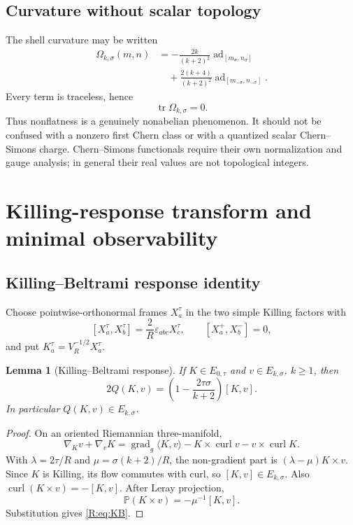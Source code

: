 \documentclass[
 aps,
 prd,
 reprint,
 amsmath,
 amssymb,
 nofootinbib,
 superscriptaddress
]{revtex4-2}
\newtheorem{lemma}[theorem]{Lemma}
\theoremstyle{definition}
\theoremstyle{remark}
\newcommand{\PP}{\mathbb P}
\newcommand{\curl}{\operatorname{curl}}
\newcommand{\gradg}{\operatorname{grad}_g}
\newcommand{\tr}{\operatorname{tr}}
\newcommand{\ad}{\operatorname{ad}}
\begin{document}
\subsection{Curvature without scalar topology}

The shell curvature may be written
\[
\begin{aligned}
 \Omega_{k,\sigma}(m,n)
 &=
 -\frac{2k}{(k+2)^2}
 \ad_{[m_\sigma,n_\sigma]}\\
 &\quad+
 \frac{2(k+4)}{(k+2)^2}
 \ad_{[m_{-\sigma},n_{-\sigma}]}.
\end{aligned}
\]
Every term is traceless, hence
\[
 \tr\Omega_{k,\sigma}=0.
\]
Thus nonflatness is a genuinely nonabelian phenomenon.  It should not be
confused with a nonzero first Chern class or with a quantized scalar
Chern--Simons charge.  Chern--Simons functionals require their own
normalization and gauge analysis; in general their real values are not
topological integers.


\section{Killing-response transform and minimal observability}

\subsection{Killing--Beltrami response identity}

Choose pointwise-orthonormal frames $X_a^\tau$ in the two simple Killing
factors with
\[
 [X_a^\tau,X_b^\tau]
 =
 \frac{2}{R}\varepsilon_{abc}X_c^\tau,
 \qquad
 [X_a^+,X_b^-]=0,
\]
and put $K_a^\tau=V_R^{-1/2}X_a^\tau$.

\begin{lemma}[Killing--Beltrami response]
\label{R:lem:KB}
If $K\in E_{0,\tau}$ and $v\in E_{k,\sigma}$, $k\ge1$, then
\begin{equation}
 \boxed{
 2Q(K,v)=
 \left(1-\frac{2\tau\sigma}{k+2}\right)[K,v].
 }
 \label{R:eq:KB}
\end{equation}
In particular $Q(K,v)\in E_{k,\sigma}$.
\end{lemma}

\begin{proof}
On an oriented Riemannian three-manifold,
\[
 \nabla_Kv+\nabla_vK
 =
 \gradg\langle K,v\rangle
 -K\times\curl v-v\times\curl K.
\]
With
$\lambda=2\tau/R$ and
$\mu=\sigma(k+2)/R$,
the non-gradient part is
$(\lambda-\mu)K\times v$.
Since $K$ is Killing, its flow commutes with curl, so
$[K,v]\in E_{k,\sigma}$.  Also
$\curl(K\times v)=-[K,v]$.
After Leray projection,
\[
 \PP(K\times v)=-\mu^{-1}[K,v].
\]
Substitution gives \eqref{R:eq:KB}.
\end{proof}
\end{document}
